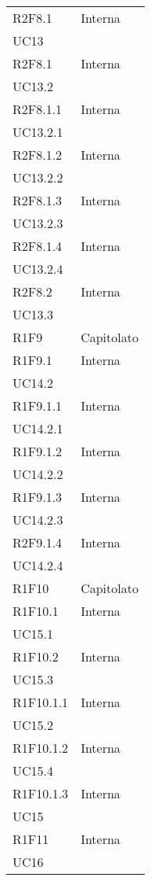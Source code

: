 \begin{longtable}{|C{6.5cm}|C{6.5cm}|}
	R2F8.1 & \centering Interna \\ UC13 \tabularnewline
	
	R2F8.1 & \centering Interna \\ UC13.2 \tabularnewline
	
	R2F8.1.1 & \centering Interna \\ UC13.2.1 \tabularnewline
	
	R2F8.1.2 & \centering Interna \\ UC13.2.2 \tabularnewline
	
	R2F8.1.3 & \centering Interna \\ UC13.2.3 \tabularnewline
	
	R2F8.1.4 & \centering Interna \\ UC13.2.4 \tabularnewline
	
	R2F8.2 & \centering Interna \\ UC13.3 \tabularnewline
	
	R1F9 &  Capitolato \\	
	
	R1F9.1 & \centering Interna \\ UC14.2 \tabularnewline
	
	R1F9.1.1 & \centering Interna \\ UC14.2.1 \tabularnewline
	
	R1F9.1.2 & \centering Interna \\ UC14.2.2 \tabularnewline
	
	R1F9.1.3 & \centering Interna \\ UC14.2.3 \tabularnewline
	
	R2F9.1.4 & \centering Interna \\ UC14.2.4 \tabularnewline
	
	R1F10 & Capitolato \\
	
	R1F10.1 &  \centering Interna \\ UC15.1 \tabularnewline
	
	R1F10.2 & \centering Interna \\ UC15.3 \tabularnewline
	
	R1F10.1.1 &  \centering Interna \\ UC15.2 \tabularnewline
	
	R1F10.1.2 &  \centering Interna \\ UC15.4 \tabularnewline
	
	R1F10.1.3 &  \centering Interna \\ UC15 \tabularnewline
	
	R1F11 & \centering Interna \\ UC16 \tabularnewline
	

\end{longtable}
